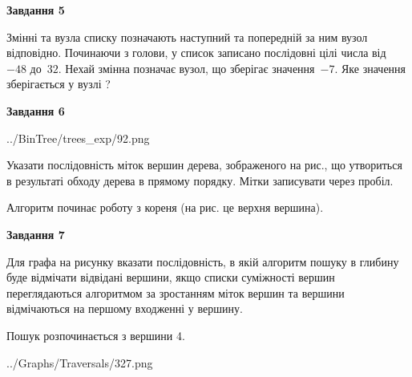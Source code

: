 \documentclass[12pt, ukrainian]{article}
\begin{document}
{\begin {large}
{\begin {center}\textbf{Завдання 5}\end {center}}\par
Змінні  та  вузла списку позначають наступний та попередній за ним вузол відповідно. Починаючи з голови, у список записано послідовні цілі числа від~$-48$ до~$32$. Нехай змінна  позначає вузол, що зберігає значення~$-7$.
Яке значення зберігається у вузлі  ?\par
\newpage

{\begin {center}\textbf{Завдання 6}\end {center}}\par

\begin{center}
	{../BinTree/trees_exp/92.png}
\end{center}
Указати послідовність міток вершин дерева, зображеного на рис., що утвориться в результаті обходу дерева в прямому порядку. Мітки записувати через пробіл.\par Алгоритм починає роботу з кореня (на рис. це верхня вершина).\par
\newpage

{\begin {center}\textbf{Завдання 7}\end {center}}\par
Для графа на рисунку вказати послідовність, в якій алгоритм пошуку в глибину буде відмічати відвідані вершини, якщо списки суміжності вершин переглядаються алгоритмом за зростанням міток вершин та вершини відмічаються на першому вход\-женні у вершину.\par
Пошук розпочинається з вершини 4.\par

\begin{center}
	{../Graphs/Traversals/327.png}
\end{center}\par
\newpage


\end{large}}
\end{document}
